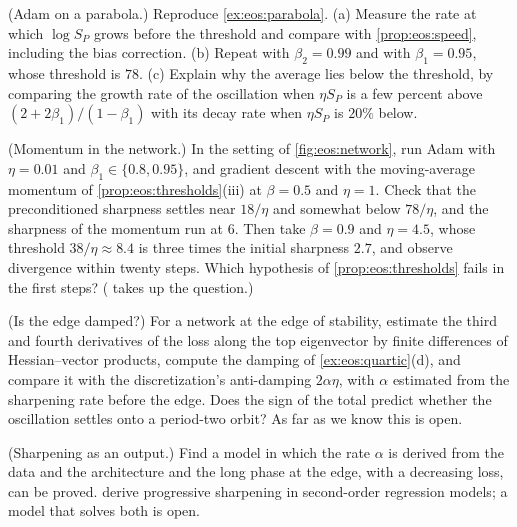 \begin{refsection}
\begin{exercises}
\item \simulation (Adam on a parabola.) Reproduce \cref{ex:eos:parabola}. (a) Measure the rate at which $\log S_P$ grows before the threshold and compare with \cref{prop:eos:speed}, including the bias correction. (b) Repeat with $\beta_2=0.99$ and with $\beta_1=0.95$, whose threshold is $78$. (c) Explain why the average lies below the threshold, by comparing the growth rate of the oscillation when $\eta S_P$ is a few percent above $(2+2\beta_1)/(1-\beta_1)$ with its decay rate when $\eta S_P$ is $20\%$ below.\label{ex:eos:adam1d}

\item \simulation (Momentum in the network.) In the setting of \cref{fig:eos:network}, run Adam with $\eta=0.01$ and $\beta_1\in\{0.8,0.95\}$, and gradient descent with the moving-average momentum of \cref{prop:eos:thresholds}(iii) at $\beta=0.5$ and $\eta=1$. Check that the preconditioned sharpness settles near $18/\eta$ and somewhat below $78/\eta$, and the sharpness of the momentum run at $6$. Then take $\beta=0.9$ and $\eta=4.5$, whose threshold $38/\eta\approx8.4$ is three times the initial sharpness $2.7$, and observe divergence within twenty steps. Which hypothesis of \cref{prop:eos:thresholds} fails in the first steps? ( takes up the question.)\label{ex:eos:network}

\item \research\hard (Is the edge damped?) For a network at the edge of stability, estimate the third and fourth derivatives of the loss along the top eigenvector by finite differences of Hessian--vector products, compute the damping of \cref{ex:eos:quartic}(d), and compare it with the discretization's anti-damping $2\alpha\eta$, with $\alpha$ estimated from the sharpening rate before the edge. Does the sign of the total predict whether the oscillation settles onto a period-two orbit? As far as we know this is open. \label{ex:eos:drift}

\item \research (Sharpening as an output.) Find a model in which the rate $\alpha$ is derived from the data and the architecture and the long phase at the edge, with a decreasing loss, can be proved. \Textcite{AgarwalaPedregosaPennington2023} derive progressive sharpening in second-order regression models; a model that solves both is open.\label{ex:eos:sharpening}
\end{exercises}


\end{refsection}

